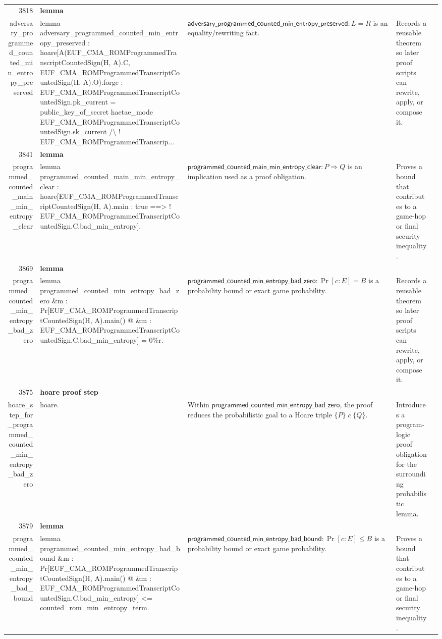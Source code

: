 \documentclass[10pt]{article}
\newcommand{\ec}[1]{\begingroup\ttfamily\scriptsize #1\endgroup}
\begin{document}
\begin{longtable}{r L{0.17\textwidth} L{0.26\textwidth} L{0.27\textwidth} L{0.20\textwidth}}
3818 & \textbf{lemma}\\\ec{adversary\_programmed\_counted\_min\_entropy\_preserved} & \ec{lemma adversary\_programmed\_counted\_min\_entropy\_preserved : hoare[A(EUF\_CMA\_ROMProgrammedTranscriptCountedSign(H, A).C, EUF\_CMA\_ROMProgrammedTranscriptCountedSign(H, A).O).forge : EUF\_CMA\_ROMProgrammedTranscriptCountedSign.pk\_current = public\_key\_of\_secret haetae\_mode EUF\_CMA\_ROMProgrammedTranscriptCountedSign.sk\_current /\textbackslash{} ! EUF\_CMA\_ROMProgrammedTranscrip...} & \(\mathsf{adversary\_programmed\_counted\_min\_entropy\_preserved} : L = R\) is an equality/rewriting fact. & Records a reusable theorem so later proof scripts can rewrite, apply, or compose it. \\
3841 & \textbf{lemma}\\\ec{programmed\_counted\_main\_min\_entropy\_clear} & \ec{lemma programmed\_counted\_main\_min\_entropy\_clear : hoare[EUF\_CMA\_ROMProgrammedTranscriptCountedSign(H, A).main : true ==> ! EUF\_CMA\_ROMProgrammedTranscriptCountedSign.C.bad\_min\_entropy].} & \(\mathsf{programmed\_counted\_main\_min\_entropy\_clear} : P \Rightarrow Q\) is an implication used as a proof obligation. & Proves a bound that contributes to a game-hop or final security inequality. \\
3869 & \textbf{lemma}\\\ec{programmed\_counted\_min\_entropy\_bad\_zero} & \ec{lemma programmed\_counted\_min\_entropy\_bad\_zero \&m : Pr[EUF\_CMA\_ROMProgrammedTranscriptCountedSign(H, A).main() @ \&m : EUF\_CMA\_ROMProgrammedTranscriptCountedSign.C.bad\_min\_entropy] = 0\%r.} & \(\mathsf{programmed\_counted\_min\_entropy\_bad\_zero} : \Pr[c : E] = B\) is a probability bound or exact game probability. & Records a reusable theorem so later proof scripts can rewrite, apply, or compose it. \\
3875 & \textbf{hoare proof step}\\\ec{hoare\_step\_for\_programmed\_counted\_min\_entropy\_bad\_zero} & \ec{hoare.} & Within \(\mathsf{programmed\_counted\_min\_entropy\_bad\_zero}\), the proof reduces the probabilistic goal to a Hoare triple \(\{P\}\;c\;\{Q\}\). & Introduces a program-logic proof obligation for the surrounding probabilistic lemma. \\
3879 & \textbf{lemma}\\\ec{programmed\_counted\_min\_entropy\_bad\_bound} & \ec{lemma programmed\_counted\_min\_entropy\_bad\_bound \&m : Pr[EUF\_CMA\_ROMProgrammedTranscriptCountedSign(H, A).main() @ \&m : EUF\_CMA\_ROMProgrammedTranscriptCountedSign.C.bad\_min\_entropy] <= counted\_rom\_min\_entropy\_term.} & \(\mathsf{programmed\_counted\_min\_entropy\_bad\_bound} : \Pr[c : E] \le B\) is a probability bound or exact game probability. & Proves a bound that contributes to a game-hop or final security inequality. \\

\end{longtable}
\end{document}
